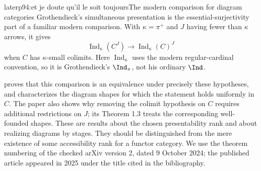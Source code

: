 \begin{dcomment}{later}{p94:et je doute qu'il le soit toujours}{The modern comparison for diagram categories}
Grothendieck's simultaneous presentation is the essential-surjectivity part of a familiar modern comparison. With $\kappa=\pi^+$ and $J$ having fewer than $\kappa$ arrows, it gives
\[
\operatorname{Ind}_{\kappa}(C^J)
\longrightarrow
\operatorname{Ind}_{\kappa}(C)^J
\]
when $C$ has $\kappa$-small colimits. Here $\operatorname{Ind}_{\kappa}$ uses the modern regular-cardinal convention, so it is Grothendieck's $\Ind_\pi$, not his ordinary $\Ind$.

\citet[Theorem 1.2 and Corollary 2.2]{Henry2025} proves that this comparison is an equivalence under precisely these hypotheses, and characterizes the diagram shapes for which the statement holds uniformly in $C$. The paper also shows why removing the colimit hypothesis on $C$ requires additional restrictions on $J$; its Theorem 1.3 treats the corresponding well-founded shapes. These are results about the chosen presentability rank and about realizing diagrams by stages. They should be distinguished from the mere existence of some accessibility rank for a functor category. We use the theorem numbering of the checked arXiv version 2, dated 9 October 2024; the published article appeared in 2025 under the title cited in the bibliography.
\end{dcomment}

